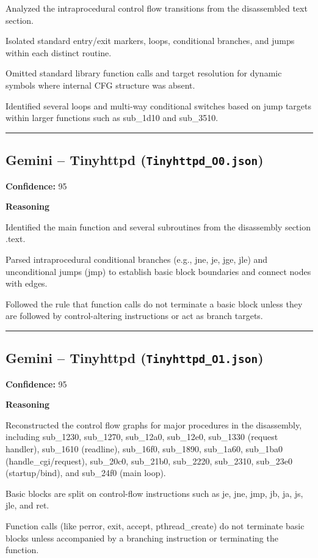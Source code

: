 Analyzed the intraprocedural control flow transitions from the disassembled text section.

Isolated standard entry/exit markers, loops, conditional branches, and jumps within each distinct routine.

Omitted standard library function calls and target resolution for dynamic symbols where internal CFG structure was absent.

Identified several loops and multi-way conditional switches based on jump targets within larger functions such as sub\_1d10 and sub\_3510.

\bigskip
\hrule
\bigskip

\subsection{Gemini -- Tinyhttpd (\texttt{Tinyhttpd\_O0.json})}

\textbf{Confidence:} 95

\textbf{Reasoning}

Identified the main function and several subroutines from the disassembly section .text.

Parsed intraprocedural conditional branches (e.g., jne, je, jge, jle) and unconditional jumps (jmp) to establish basic block boundaries and connect nodes with edges.

Followed the rule that function calls do not terminate a basic block unless they are followed by control-altering instructions or act as branch targets.

\bigskip
\hrule
\bigskip

\subsection{Gemini -- Tinyhttpd (\texttt{Tinyhttpd\_O1.json})}

\textbf{Confidence:} 95

\textbf{Reasoning}

Reconstructed the control flow graphs for major procedures in the disassembly, including sub\_1230, sub\_1270, sub\_12a0, sub\_12e0, sub\_1330 (request handler), sub\_1610 (readline), sub\_16f0, sub\_1890, sub\_1a60, sub\_1ba0 (handle\_cgi/request), sub\_20c0, sub\_21b0, sub\_2220, sub\_2310, sub\_23e0 (startup/bind), and sub\_24f0 (main loop).

Basic blocks are split on control-flow instructions such as je, jne, jmp, jb, ja, js, jle, and ret.

Function calls (like perror, exit, accept, pthread\_create) do not terminate basic blocks unless accompanied by a branching instruction or terminating the function.


